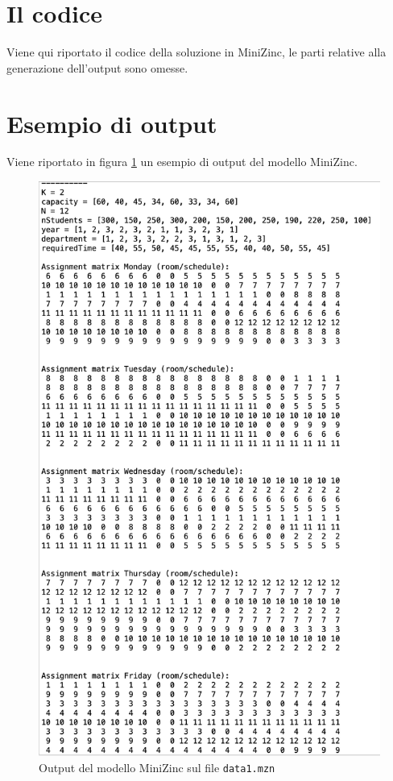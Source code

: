 \documentclass[12pt, italian, openany]{book}
\begin{document}
\section{Il codice}
Viene qui riportato il codice della soluzione in MiniZinc, le parti relative alla generazione dell'output sono omesse.



\section{Esempio di output}
Viene riportato in figura \ref{esempio} un esempio di output del modello MiniZinc.

\begin{figure}
\includegraphics[scale=0.5]{Output_MiniZinc}
\caption{Output del modello MiniZinc sul file \texttt{data1.mzn}}
\label{esempio}
\end{figure}
\end{document}
